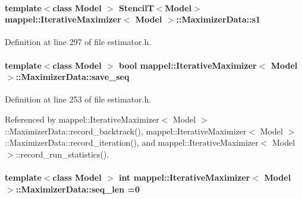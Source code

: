 \paragraph[{\texorpdfstring{s1}{s1}}]{\setlength{\rightskip}{0pt plus 5cm}template$<$class Model $>$ {\bf StencilT}$<$Model$>$ {\bf mappel\+::\+Iterative\+Maximizer}$<$ Model $>$\+::Maximizer\+Data\+::s1\hspace{0.3cm}{\ttfamily [protected]}}\hypertarget{classmappel_1_1IterativeMaximizer_1_1MaximizerData_a3c0f6ec4ba531dfefe8e4b73f537192d}{}\label{classmappel_1_1IterativeMaximizer_1_1MaximizerData_a3c0f6ec4ba531dfefe8e4b73f537192d}


Definition at line 297 of file estimator.\+h.

\paragraph[{\texorpdfstring{save\+\_\+seq}{save_seq}}]{\setlength{\rightskip}{0pt plus 5cm}template$<$class Model $>$ bool {\bf mappel\+::\+Iterative\+Maximizer}$<$ Model $>$\+::Maximizer\+Data\+::save\+\_\+seq}\hypertarget{classmappel_1_1IterativeMaximizer_1_1MaximizerData_af13babebeb16147883db7af0b4875b53}{}\label{classmappel_1_1IterativeMaximizer_1_1MaximizerData_af13babebeb16147883db7af0b4875b53}


Definition at line 253 of file estimator.\+h.



Referenced by mappel\+::\+Iterative\+Maximizer$<$ Model $>$\+::\+Maximizer\+Data\+::record\+\_\+backtrack(), mappel\+::\+Iterative\+Maximizer$<$ Model $>$\+::\+Maximizer\+Data\+::record\+\_\+iteration(), and mappel\+::\+Iterative\+Maximizer$<$ Model $>$\+::record\+\_\+run\+\_\+statistics().

\paragraph[{\texorpdfstring{seq\+\_\+len}{seq_len}}]{\setlength{\rightskip}{0pt plus 5cm}template$<$class Model $>$ int {\bf mappel\+::\+Iterative\+Maximizer}$<$ Model $>$\+::Maximizer\+Data\+::seq\+\_\+len =0\hspace{0.3cm}{\ttfamily [protected]}}\hypertarget{classmappel_1_1IterativeMaximizer_1_1MaximizerData_a78a56d5ffe0cad0de474e244816748a6}{}\label{classmappel_1_1IterativeMaximizer_1_1MaximizerData_a78a56d5ffe0cad0de474e244816748a6}


